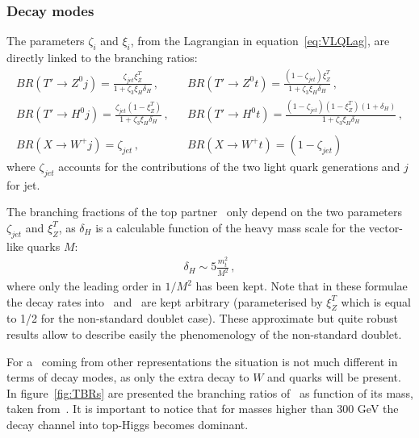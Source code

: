 \subsubsection{Decay modes}
\label{sec:decay}

The parameters $\zeta_{i}$ and $\xi_i$, from the Lagrangian in equation~\ref{eq:VLQLag}, are directly linked to the branching ratios:
 \begin{eqnarray} 
BR (T' \to Z^{0} j) = \frac{\zeta_{jet} \xi^T_Z}{1+\zeta_3 \xi_H \delta_H}\,, & & BR (T' \to Z^{0} t) = \frac{(1-\zeta_{jet}) \xi^T_Z}{1+\zeta_3 
\xi_H \delta_H}\,,\\
BR(T' \to H^{0} j) = \frac{\zeta_{jet} (1-\xi^T_Z)}{1+\zeta_3 \xi_H \delta_H}\,, & &  BR(T' \to H^{0} t) = \frac{(1-\zeta_{jet})
(1-\xi^T_Z) (1+\delta_H)}{1+\zeta_3 \xi_H \delta_H}\,, \nonumber\\
 & & \nonumber \\
BR(X \to W^{+} j) = \zeta_{jet}\,, & & BR(X \to W^{+} t) = (1-\zeta_{jet})
 \end{eqnarray} where $\zeta_{jet}$ accounts for the contributions of the two light quark generations and $j$ for jet.

The branching fractions of the top partner \Tp~only depend on the two parameters $\zeta_{jet}$ and $\xi_Z^{T}$, as $\delta_H$ is a calculable function of the heavy mass scale for the vector-like quarks $M$:
\begin{eqnarray} 
\delta_H  \sim 5 \frac{m^2_t}{M^2}\,, \label{eq:deltaH}
\end{eqnarray} 
where only the leading order in $1/M^2$ has been kept. Note that in these formulae the decay rates into \Z~and \Hb~are kept arbitrary (parameterised by $\xi_Z^{T}$ which is equal to 1/2 for the non-standard doublet case). These approximate but quite robust results allow to describe easily the phenomenology of the non-standard doublet. 

For a \Tp~coming from other representations the situation is not much different in terms of decay modes, as only the extra decay to $W$ and quarks will be present. In figure~\ref{fig:TBRs} are presented the branching ratios of \Tp~as function of its mass, taken from~\cite{Cacciapaglia:2011fx}. It is important to notice that for masses higher than 300 GeV the decay channel into top-Higgs becomes dominant.

